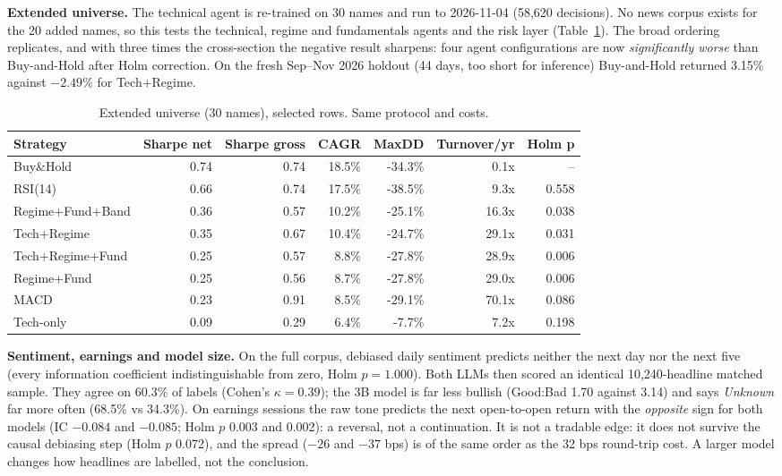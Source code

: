 \documentclass[10pt,a4paper]{article}
\begin{document}
\textbf{Extended universe.} The technical agent is re-trained on 30 names and run to 2026-11-04 (58,620 decisions). No news corpus exists for the 20 added names, so this tests the technical, regime and fundamentals agents and the risk layer (Table~\ref{tab:ext}). The broad ordering replicates, and with three times the cross-section the negative result sharpens: four agent configurations are now \emph{significantly worse} than Buy-and-Hold after Holm correction. On the fresh Sep--Nov 2026 holdout (44 days, too short for inference) Buy-and-Hold returned 3.15\% against $-2.49\%$ for Tech+Regime.

\begin{table}[H]
\centering\small
\caption{Extended universe (30 names), selected rows. Same protocol and costs.}\label{tab:ext}
\begin{tabular}{lrrrrrr}
\toprule
\textbf{Strategy} & \textbf{Sharpe net} & \textbf{Sharpe gross} & \textbf{CAGR} & \textbf{MaxDD} & \textbf{Turnover/yr} & \textbf{Holm p} \\
\midrule
Buy\&Hold & 0.74 & 0.74 & 18.5\% & -34.3\% & 0.1x & -- \\
RSI(14) & 0.66 & 0.74 & 17.5\% & -38.5\% & 9.3x & 0.558 \\
Regime+Fund+Band & 0.36 & 0.57 & 10.2\% & -25.1\% & 16.3x & 0.038 \\
Tech+Regime & 0.35 & 0.67 & 10.4\% & -24.7\% & 29.1x & 0.031 \\
Tech+Regime+Fund & 0.25 & 0.57 & 8.8\% & -27.8\% & 28.9x & 0.006 \\
Regime+Fund & 0.25 & 0.56 & 8.7\% & -27.8\% & 29.0x & 0.006 \\
MACD & 0.23 & 0.91 & 8.5\% & -29.1\% & 70.1x & 0.086 \\
Tech-only & 0.09 & 0.29 & 6.4\% & -7.7\% & 7.2x & 0.198 \\
\bottomrule
\end{tabular}
\end{table}

\textbf{Sentiment, earnings and model size.} On the full corpus, debiased daily sentiment predicts neither the next day nor the next five (every information coefficient indistinguishable from zero, Holm $p=1.000$). Both LLMs then scored an identical 10,240-headline matched sample. They agree on 60.3\% of labels (Cohen's $\kappa=0.39$); the 3B model is far less bullish (Good:Bad 1.70 against 3.14) and says \emph{Unknown} far more often (68.5\% vs 34.3\%). On earnings sessions the raw tone predicts the next open-to-open return with the \emph{opposite} sign for both models (IC $-0.084$ and $-0.085$; Holm $p$ 0.003 and 0.002): a reversal, not a continuation. It is not a tradable edge: it does not survive the causal debiasing step (Holm $p$ 0.072), and the spread ($-26$ and $-37$ bps) is of the same order as the 32 bps round-trip cost. A larger model changes how headlines are labelled, not the conclusion.
\end{document}
